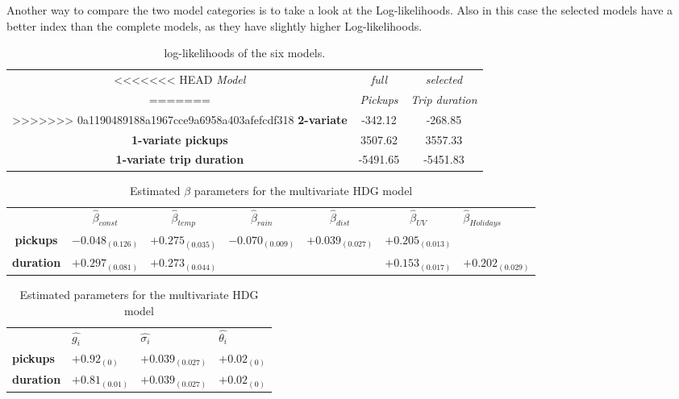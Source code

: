Another way to compare the two model categories is to take a look at the Log-likelihoods. Also in this case the selected models have a better index than the complete models, as they have slightly higher Log-likelihoods.
\begin{table}[h!]
	\centering
	\renewcommand\arraystretch{1.3}
	\begin{tabular}{c|c|c}
		\hline
<<<<<<< HEAD
		\textit{Model} &\textit{full } & \textit{selected} \\ 
=======
		\textit{} &\textit{Pickups} & \textit{Trip duration} \\ 
>>>>>>> 0a1190489188a1967cce9a6958a403afefcdf318
		\hline
		\textbf{2-variate } & -342.12  & -268.85    \\ 
		\hline
		\textbf{1-variate pickups } & 3507.62  & 3557.33    \\ 
		\hline
		\textbf{1-variate trip duration} & -5491.65  & -5451.83   \\ 
		\hline
	\end{tabular}
	\caption[Log-likelihoods of the six models (HDGM)]{log-likelihoods of the six models.}
	\label{Log-likelihoods HDGM}
\end{table}

\begin{table}[h!]
	\centering
	\begin{tabular}{|ccccccl}
		\hline
		& $\hat{\beta}_{const}$  & $\hat{\beta}_{temp}$ & $\hat{\beta}_{rain}$ & $\hat{\beta}_{dist}$ & $\hat{\beta}_{UV}$ &$\hat{\beta}_{Holidays}$      \\ \cline{2-7} 
		\multicolumn{1}{|c|}{\textbf{pickups}}  & $-0.048_{(0.126)}$ & $+0.275_{(0.035)}$ & $-0.070_{(0.009)}$ & $+0.039_{(0.027)}$ & $+0.205_{(0.013)}$ &              \\
		\multicolumn{1}{|c|}{\textbf{duration}} & $+0.297_{(0.081)}$  & $+0.273_{(0.044)}$ &               &               & $+0.153_{(0.017)}$  & $+0.202_{(0.029)}$
	\end{tabular}
\caption{Estimated $\beta$ parameters for the multivariate HDG model}
\label{Bivariate Beta HDGM}
\end{table}

\begin{table}[]
	\begin{tabular}{|llll}
		\hline
		& $\hat{g_i}$  & $\hat{\sigma_i}$ & $\hat{\theta_i}$  \\ \cline{2-4} 
		\multicolumn{1}{|l|}{\textbf{pickups}}  &  $+0.92_{(0)}$ &  $+0.039_{(0.027)}$ & \multicolumn{1}{c}{$+0.02_{(0)}$ } \\
		\multicolumn{1}{|l|}{\textbf{duration}} &  $+0.81_{(0.01)}$ &  $+0.039_{(0.027)}$ &     $+0.02_{(0)}$                              
	\end{tabular}
	\caption{Estimated parameters for the multivariate HDG model}
\label{Bivariate Param_HDGM}
\end{table}

